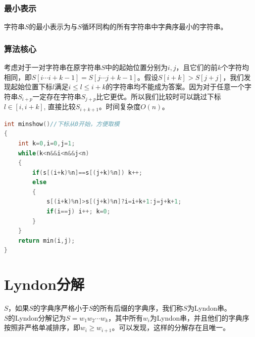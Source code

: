 \documentclass[a4paper]{book}
\begin{document}
\subsubsection{最小表示}
字符串$S$的最小表示为与$S$循环同构的所有字符串中字典序最小的字符串。
\subsubsection{算法核心}
考虑对于一对字符串在原字符串$S$中的起始位置分别为$i,j$，且它们的前$k$个字符均相同，即$S[i\cdots i+k-1]=S[j\cdots j+k-1]$。假设$S[i+k]>S[j+j]$，我们发现起始位置下标$l$满足$i\leq l\leq i+k$的字符串均不能成为答案。因为对于任意一个字符串$S_{i+p}$一定存在字符串$S_{j+p}$比它更优。所以我们比较时可以跳过下标$l\in[i,i+k]$, 直接比较$S_{i+k+1}$。时间复杂度$O(n)$。 
\begin{lstlisting}[language=c++]
int minshow()//下标从0开始，方便取模
{
    int k=0,i=0,j=1;
    while(k<n&&i<n&&j<n) 
    {
        if(s[(i+k)%n]==s[(j+k)%n]) k++;
        else 
        {
            s[(i+k)%n]>s[(j+k)%n]?i=i+k+1:j=j+k+1;
            if(i==j) i++; k=0;
        }
    }
    return min(i,j);
}
\end{lstlisting}
\section{Lyndon分解}
$S$，如果$S$的字典序严格小于$S$的所有后缀的字典序，我们称$S$为Lyndon串。\\
$S$的Lyndon分解记为$S=w_1w_2\cdots w_k$，其中所有$w_i$为Lyndon串，并且他们的字典序按照非严格单减排序，即$w_i\ge w_{i+1}$。可以发现，这样的分解存在且唯一。
\end{document}
